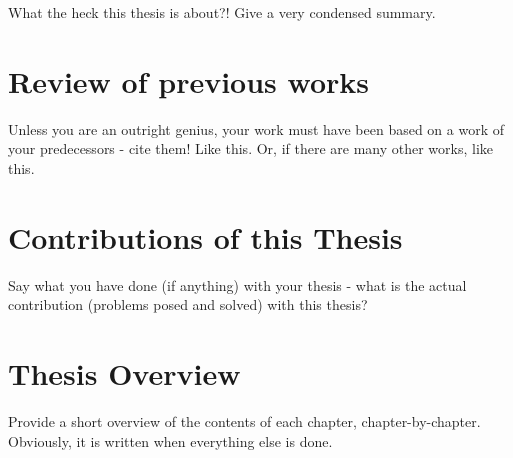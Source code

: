 

What the heck this thesis is about?! Give a very condensed summary.



\section{Review of previous works}
Unless you are an outright genius, your work must have been based on a work of your predecessors - cite them! Like this\cite{mita1977zeros}. Or, if there are many other works, like this\cite{astrom2011computer,annaswamy2001adaptive,doyle1979robustnesswithobservers}.


\section{Contributions of this Thesis}
Say what you have done (if anything) with your thesis - what is the actual contribution (problems posed and solved) with this thesis?


\section{Thesis Overview}
Provide a short overview of the contents of each chapter, chapter-by-chapter. Obviously, it is written when everything else is done.